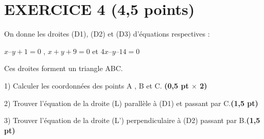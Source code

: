 \documentclass{article}
\begin{document}
\section*{EXERCICE 4 (4,5 points)}
On donne les droites (D1), (D2) et (D3) d’équations respectives :

\( x – y + 1 =0\) ,  \(x + y + 9 = 0\) et  	 \(4x – y – 14 = 0\)

    Ces droites forment un triangle ABC. 
    
    1) Calculer les coordonnées des points A , B et C. \textbf{(0,5 pt $\times$ 2)}
    
    2) Trouver l’équation de la droite (L) parallèle à (D1) et passant par C.\textbf{(1,5 pt)}
    
    3) Trouver l’équation de la droite (L’) perpendiculaire à (D2) passant par B.\textbf{(1,5 pt)}
    
\end{document}
